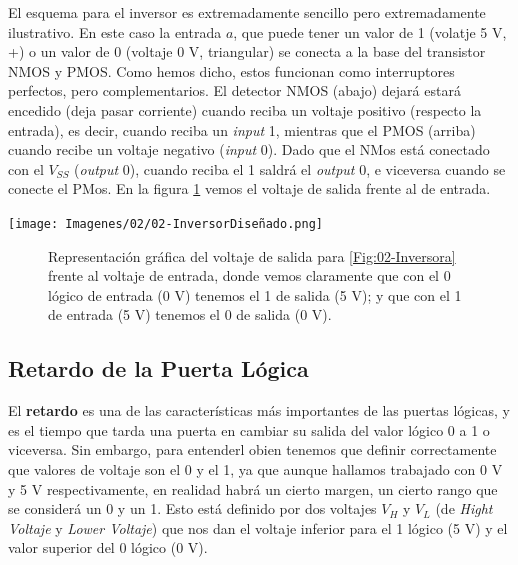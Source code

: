 \begin{minipage}{0.65\linewidth}
El esquema para el inversor es extremadamente sencillo pero extremadamente ilustrativo. En este caso la entrada $a$, que puede tener un valor de 1 (volatje 5 V, +) o un valor de 0 (voltaje 0 V, triangular) se conecta a la base del transistor NMOS y PMOS. Como hemos dicho, estos funcionan como interruptores perfectos, pero complementarios. El detector NMOS (abajo) dejará estará encedido (deja pasar corriente) cuando reciba un voltaje positivo (respecto la entrada), es decir, cuando reciba un \textit{input} 1, mientras que el PMOS (arriba) cuando recibe un voltaje negativo (\textit{input} 0). Dado que el NMos está conectado con el $V_{SS}$ (\textit{output} 0), cuando reciba el 1 saldrá el \textit{output} 0, e viceversa cuando se conecte el PMos. En la figura \cref{Fig:02-InversorV} vemos el voltaje de salida frente al de entrada.
\end{minipage}
\hfill
\begin{minipage}{0.32\linewidth} \centering
    \texttt{[image: Imagenes/02/02-InversorDiseñado.png]}
    \label{Fig:02-Inversora}
\end{minipage}


\begin{figure}[H] \centering
{}
\caption{Representación gráfica del voltaje de salida para \cref{Fig:02-Inversora} frente al voltaje de entrada, donde vemos claramente que con el 0 lógico de entrada (0 V) tenemos el 1 de salida (5 V); y que con el 1 de entrada (5 V) tenemos el 0 de salida (0 V).}
\label{Fig:02-InversorV}
\end{figure}



\subsection{Retardo de la Puerta Lógica}

El \textbf{retardo} es una de las características más importantes de las puertas lógicas, y es el tiempo que tarda una puerta en cambiar su salida del valor lógico 0 a 1 o viceversa. Sin embargo, para entenderl obien tenemos que definir correctamente que valores de voltaje son el 0 y el 1, ya que aunque hallamos trabajado con 0 V y 5 V respectivamente, en realidad habrá un cierto margen, un cierto rango que se considerá un 0 y un 1. Esto está definido por dos voltajes $V_H$ y $V_L$ (de \textit{Hight Voltaje} y \textit{Lower Voltaje}) que nos dan el voltaje inferior para el 1 lógico (5 V) y el valor superior del 0 lógico (0 V).

